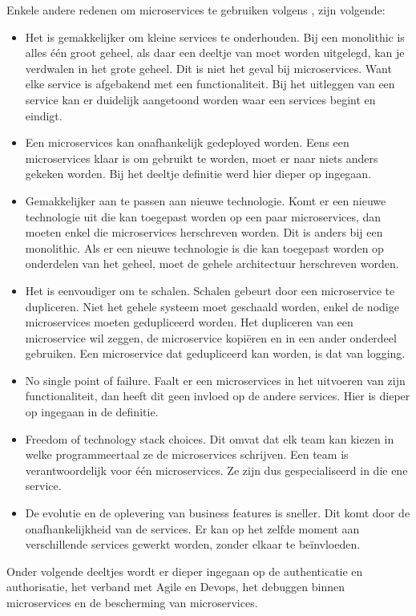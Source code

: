 Enkele andere redenen om microservices te gebruiken volgens \textcite{Koukia2018}, zijn volgende:
\begin{itemize}
	\item Het is gemakkelijker om kleine services te onderhouden. Bij een monolithic is alles één groot geheel, als daar een deeltje van moet worden uitgelegd, kan je verdwalen in het grote geheel. Dit is niet het geval bij microservices. Want elke service is afgebakend met een functionaliteit. Bij het uitleggen van een service kan er duidelijk aangetoond worden waar een services begint en eindigt. 
	\item Een microservices kan onafhankelijk gedeployed worden. Eens een microservices klaar is om gebruikt te worden, moet er naar niets anders gekeken worden. Bij het deeltje definitie  werd hier dieper op ingegaan.
	\item Gemakkelijker aan te passen aan nieuwe  technologie. Komt er een nieuwe  technologie uit die kan toegepast worden op een paar microservices, dan moeten enkel die microservices herschreven worden. Dit is anders bij een monolithic. Als er een nieuwe  technologie is die kan toegepast worden op onderdelen van het geheel, moet de gehele architectuur herschreven worden.
	\item Het is eenvoudiger om te schalen. Schalen gebeurt door een microservice te dupliceren. Niet het gehele systeem moet geschaald worden, enkel de nodige microservices moeten gedupliceerd worden. Het dupliceren van een microservice wil zeggen, de microservice kopiëren en in een ander onderdeel gebruiken. Een microservice dat gedupliceerd kan worden, is dat van logging. 
	\item No single point of failure. Faalt er een microservices in het uitvoeren van zijn functionaliteit, dan heeft dit geen invloed op de andere services. Hier is dieper op ingegaan in de definitie.
	\item Freedom of technology stack choices. Dit omvat dat elk team kan kiezen in  welke programmeertaal ze de microservices schrijven. Een team is verantwoordelijk voor één microservices. Ze zijn dus gespecialiseerd in die ene service. 
	\item De evolutie en de oplevering van business features is sneller. Dit komt door de onafhankelijkheid van de services. Er kan op het zelfde moment aan verschillende services gewerkt worden, zonder elkaar te beïnvloeden.
\end{itemize}


Onder volgende deeltjes wordt er dieper ingegaan op de authenticatie en authorisatie, het verband met Agile en Devops, het debuggen binnen microservices en de bescherming van microservices.

